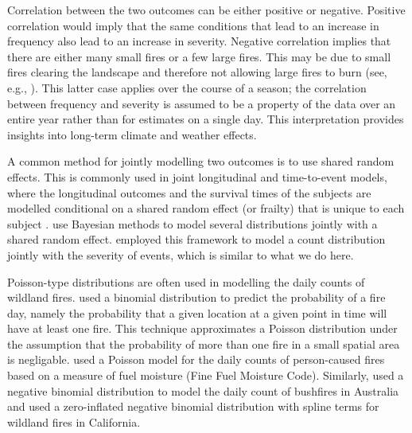 \documentclass[10pt,letterpaper]{article}
\begin{document}
Correlation between the two outcomes can be either positive or negative.
Positive correlation would imply that the same conditions that lead to
an increase in frequency also lead to an increase in severity. Negative
correlation implies that there are either many small fires or a few
large fires. This may be due to small fires clearing the landscape and
therefore not allowing large fires to burn (see, e.g.,
\cite{kayAreLightningFires2007}). This latter case applies over the
course of a season; the correlation between frequency and severity is
assumed to be a property of the data over an entire year rather than for
estimates on a single day. This interpretation provides insights into
long-term climate and weather effects.

A common method for jointly modelling two outcomes is to use shared random effects. This is commonly used in joint longitudinal and time-to-event models, where the longitudinal outcomes and the survival times of the subjects are modelled conditional on a shared random effect (or frailty) that is unique to each subject \cite{wulfsohnJointModelSurvival1997a}. \cite{dunsonBayesianLatentVariable2000} use Bayesian methods to model several distributions jointly with a shared random effect. \cite{juarez-colungaJointModelingZeroinflated2017} employed this framework to model a count distribution jointly with the severity of events, which is similar to what we do here.

Poisson-type distributions are often used in modelling the daily counts
of wildland fires. \cite{martellLogisticModelPredicting} used a
binomial distribution to predict the probability of a fire day, namely the probability that a given location at a given point in time will have at least one fire. This technique approximates a Poisson distribution under the assumption
that the probability of more than one fire in a small spatial area is negligable.
\cite{cunninghamStochasticModelOccurence} used a Poisson model for the
daily counts of person-caused fires based on a measure of fuel moisture (Fine Fuel Moisture Code). Similarly,
\cite{plucinskiPredictingNumberDaily2014} used a negative binomial
distribution to model the daily count of bushfires in Australia and
\cite{josephSpatiotemporalPredictionWildfire2019} used a zero-inflated
negative binomial distribution with spline terms for wildland fires in
California.
\end{document}
